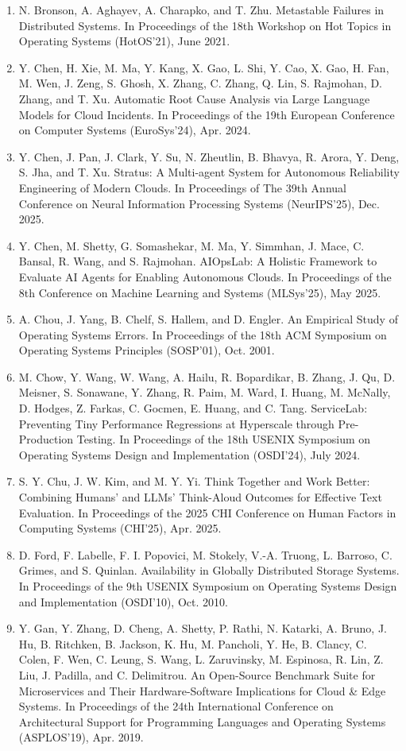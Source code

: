 \documentclass[11pt,UTF8,fontset=fandol]{ctexart}
\begin{document}
\begin{enumerate}[leftmargin=2.2em,labelsep=0.4em,itemsep=0.15em]
\item N. Bronson, A. Aghayev, A. Charapko, and T. Zhu. Metastable Failures in Distributed Systems. In Proceedings of the 18th Workshop on Hot Topics in Operating Systems (HotOS'21), June 2021.
\item Y. Chen, H. Xie, M. Ma, Y. Kang, X. Gao, L. Shi, Y. Cao, X. Gao, H. Fan, M. Wen, J. Zeng, S. Ghosh, X. Zhang, C. Zhang, Q. Lin, S. Rajmohan, D. Zhang, and T. Xu. Automatic Root Cause Analysis via Large Language Models for Cloud Incidents. In Proceedings of the 19th European Conference on Computer Systems (EuroSys'24), Apr. 2024.
\item Y. Chen, J. Pan, J. Clark, Y. Su, N. Zheutlin, B. Bhavya, R. Arora, Y. Deng, S. Jha, and T. Xu. Stratus: A Multi-agent System for Autonomous Reliability Engineering of Modern Clouds. In Proceedings of The 39th Annual Conference on Neural Information Processing Systems (NeurIPS'25), Dec. 2025.
\item Y. Chen, M. Shetty, G. Somashekar, M. Ma, Y. Simmhan, J. Mace, C. Bansal, R. Wang, and S. Rajmohan. AIOpsLab: A Holistic Framework to Evaluate AI Agents for Enabling Autonomous Clouds. In Proceedings of the 8th Conference on Machine Learning and Systems (MLSys'25), May 2025.
\item A. Chou, J. Yang, B. Chelf, S. Hallem, and D. Engler. An Empirical Study of Operating Systems Errors. In Proceedings of the 18th ACM Symposium on Operating Systems Principles (SOSP'01), Oct. 2001.
\item M. Chow, Y. Wang, W. Wang, A. Hailu, R. Bopardikar, B. Zhang, J. Qu, D. Meisner, S. Sonawane, Y. Zhang, R. Paim, M. Ward, I. Huang, M. McNally, D. Hodges, Z. Farkas, C. Gocmen, E. Huang, and C. Tang. ServiceLab: Preventing Tiny Performance Regressions at Hyperscale through Pre-Production Testing. In Proceedings of the 18th USENIX Symposium on Operating Systems Design and Implementation (OSDI'24), July 2024.
\item S. Y. Chu, J. W. Kim, and M. Y. Yi. Think Together and Work Better: Combining Humans' and LLMs' Think-Aloud Outcomes for Effective Text Evaluation. In Proceedings of the 2025 CHI Conference on Human Factors in Computing Systems (CHI'25), Apr. 2025.
\item D. Ford, F. Labelle, F. I. Popovici, M. Stokely, V.-A. Truong, L. Barroso, C. Grimes, and S. Quinlan. Availability in Globally Distributed Storage Systems. In Proceedings of the 9th USENIX Symposium on Operating Systems Design and Implementation (OSDI'10), Oct. 2010.
\item Y. Gan, Y. Zhang, D. Cheng, A. Shetty, P. Rathi, N. Katarki, A. Bruno, J. Hu, B. Ritchken, B. Jackson, K. Hu, M. Pancholi, Y. He, B. Clancy, C. Colen, F. Wen, C. Leung, S. Wang, L. Zaruvinsky, M. Espinosa, R. Lin, Z. Liu, J. Padilla, and C. Delimitrou. An Open-Source Benchmark Suite for Microservices and Their Hardware-Software Implications for Cloud \& Edge Systems. In Proceedings of the 24th International Conference on Architectural Support for Programming Languages and Operating Systems (ASPLOS'19), Apr. 2019.

\end{enumerate}
\end{document}
